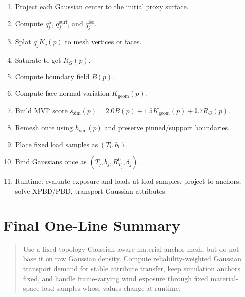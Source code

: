 \documentclass[11pt,a4paper]{article}
\begin{document}
\begin{enumerate}[leftmargin=2em]
\item Project each Gaussian center to the initial proxy surface.
\item Compute $q_j^\alpha$, $q_j^{\mathrm{surf}}$, and $q_j^{\mathrm{iso}}$.
\item Splat $q_jK_j(p)$ to mesh vertices or faces.
\item Saturate to get $R_G(p)$.
\item Compute boundary field $B(p)$.
\item Compute face-normal variation $K_{\mathrm{geom}}(p)$.
\item Build MVP score $s_{\mathrm{sim}}(p)=2.0B(p)+1.5K_{\mathrm{geom}}(p)+0.7R_G(p)$.
\item Remesh once using $h_{\mathrm{sim}}(p)$ and preserve pinned/support boundaries.
\item Place fixed load samples as $(T_l,b_l)$.
\item Bind Gaussians once as $(T_j,b_j,R_{T_j}^0,\delta_j)$.
\item Runtime: evaluate exposure and loads at load samples, project to anchors, solve XPBD/PBD, transport Gaussian attributes.
\end{enumerate}

\section{Final One-Line Summary}

\begin{quote}
Use a fixed-topology Gaussian-aware material anchor mesh, but do not base it on raw Gaussian density. Compute reliability-weighted Gaussian transport demand for stable attribute transfer, keep simulation anchors fixed, and handle frame-varying wind exposure through fixed material-space load samples whose values change at runtime.
\end{quote}
\end{document}
